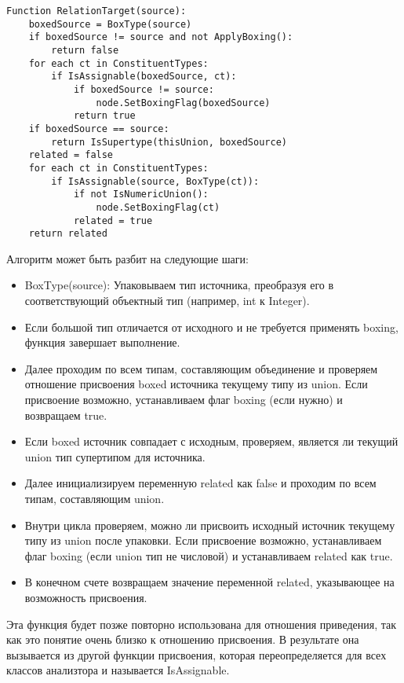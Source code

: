 \begin{lstlisting}[label={lst:relationtarget}]
Function RelationTarget(source):
    boxedSource = BoxType(source)
    if boxedSource != source and not ApplyBoxing():
        return false
    for each ct in ConstituentTypes:
        if IsAssignable(boxedSource, ct):
            if boxedSource != source:
                node.SetBoxingFlag(boxedSource)
            return true
    if boxedSource == source:
        return IsSupertype(thisUnion, boxedSource)
    related = false
    for each ct in ConstituentTypes:
        if IsAssignable(source, BoxType(ct)):
            if not IsNumericUnion():
                node.SetBoxingFlag(ct)
            related = true
    return related
\end{lstlisting}

Алгоритм может быть разбит на следующие шаги:

\begin{itemize}
    \item BoxType(source): Упаковываем тип источника, преобразуя его в соответствующий объектный тип
    (например, int к Integer).
    \item Если большой тип отличается от исходного и не требуется применять boxing, функция завершает выполнение.
    \item Далее проходим по всем типам, составляющим объединение и проверяем отношение присвоения boxed источника
    текущему типу из union.
    Если присвоение возможно, устанавливаем флаг boxing (если нужно) и возвращаем true.
    \item Если boxed источник совпадает с исходным, проверяем, является ли текущий union тип супертипом для источника.
    \item Далее инициализируем переменную related как false и проходим по всем типам, составляющим union.
    \item Внутри цикла проверяем, можно ли присвоить исходный источник текущему типу из union после упаковки.
    Если присвоение возможно, устанавливаем флаг boxing (если union тип не числовой) и устанавливаем related как true.
    \item В конечном счете возвращаем значение переменной related, указывающее на возможность присвоения.
\end{itemize}

Эта функция будет позже повторно использована для отношения приведения, так как это понятие очень близко к отношению
присвоения.
В результате она вызывается из другой функции присвоения, которая переопределяется для всех классов анализтора и
называется IsAssignable.

